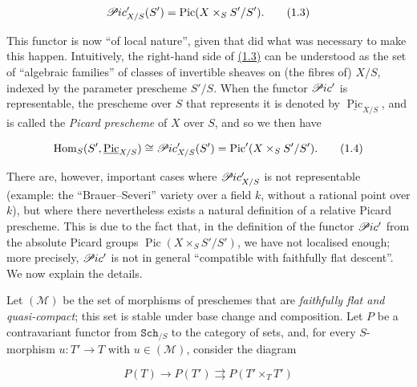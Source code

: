 \documentclass{article}
\newenvironment{eqenv}
  {}
  {}
\newcommand{\oldpage}[1]{\marginpar{\footnotesize$\Big\vert$ \textit{p.~#1}}}
\theoremstyle{definition}
\theoremstyle{definition}
\theoremstyle{definition}
\theoremstyle{definition}
\theoremstyle{remark}
\begin{document}
\leavevmode{}%
\begin{eqenv}
\[
  \mathscr{P}\kern -.5pt ic'_{X/S}(S')
  = \operatorname{Pic}(X\times_S S'/S').
\tag{1.3}
\]

\end{eqenv}

\oldpage{232-02}This functor is now ``of local nature'', given that did what was necessary to make this happen.
Intuitively, the right-hand side of \protect\hyperlink{fga-3-v-equation-1.3}{(1.3)} can be understood as the set of ``algebraic families'' of classes of invertible sheaves on (the fibres of) \(X/S\), indexed by the parameter prescheme \(S'/S\).
When the functor \(\mathscr{P}\kern -.5pt ic'\) is representable, the prescheme over \(S\) that represents it is denoted by \(\underline{\operatorname{Pic}}_{X/S}\), and is called the \emph{Picard prescheme} of \(X\) over \(S\), and so we then have

\leavevmode{}%
\begin{eqenv}
\[
  \operatorname{Hom}_S(S',\underline{\operatorname{Pic}}_{X/S})
  \cong \mathscr{P}\kern -.5pt ic'_{X/S}(S')
  = \operatorname{Pic}'(X\times_S S'/S').
\tag{1.4}
\]

\end{eqenv}

There are, however, important cases where \(\mathscr{P}\kern -.5pt ic'_{X/S}\) is not representable (example: the ``Brauer--Severi'' variety over a field \(k\), without a rational point over \(k\)), but where there nevertheless exists a natural definition of a relative Picard prescheme.
This is due to the fact that, in the definition of the functor \(\mathscr{P}\kern -.5pt ic'\) from the absolute Picard groups \(\operatorname{Pic}(X\times_S S'/S')\), we have not localised enough;
more precisely, \(\mathscr{P}\kern -.5pt ic'\) is not in general ``compatible with faithfully flat descent''.
We now explain the details.

Let \(({\mathscr{M}})\) be the set of morphisms of preschemes that are \emph{faithfully flat and quasi-compact};
this set is stable under base change and composition.
Let \(P\) be a contravariant functor from \(\mathtt{Sch}_{/S}\) to the category of sets, and, for every \(S\)-morphism \(u\colon T'\to T\) with \(u\in({\mathscr{M}})\), consider the diagram

\leavevmode{}%
\begin{eqenv}
\[
  P(T)
  \to P(T')
  \rightrightarrows P(T'\times_T T')
\tag{1.5}
\]

\end{eqenv}
\end{document}
